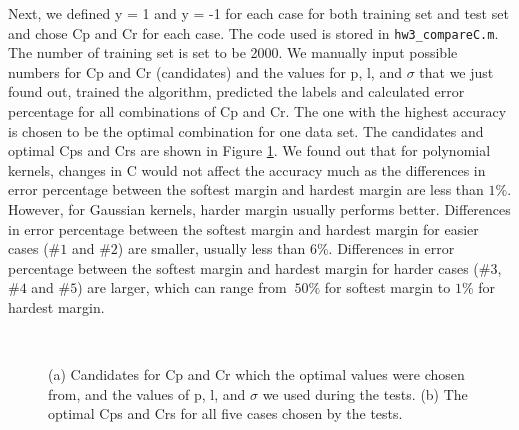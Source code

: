 \documentclass[UTF8,12pt]{article}
\begin{document}
	Next, we defined y = 1 and y = -1 for each case for both training set and test set and chose Cp and Cr for each case. The code used is stored in \texttt{hw3\_compareC.m}. The number of training set is set to be 2000. We manually input possible numbers for Cp and Cr (candidates) and the values for p, l, and $\sigma$ that we just found out, trained the algorithm, predicted the labels and calculated error percentage for all combinations of Cp and Cr. The one with the highest accuracy is chosen to be the optimal combination for one data set. The candidates and optimal Cps and Crs are shown in Figure \ref{fig:C}. We found out that for polynomial kernels, changes in C would not affect the accuracy much as the differences in error percentage between the softest margin and hardest margin are less than $1\%$. However, for Gaussian kernels, harder margin usually performs better. Differences in error percentage between the softest margin and hardest margin for easier cases ($\#1$ and $\#2$) are smaller, usually less than $6\%$. Differences in error percentage between the softest margin and hardest margin for harder cases ($\#3$, $\#4$ and $\#5$) are larger, which can range from $~50\%$ for softest margin to $1\%$ for hardest margin.
	\begin{figure}[!ht]
		\centering
		\\
		\caption{\label{fig:C}(a) Candidates for Cp and Cr which the optimal values were chosen from, and the values of p, l, and $\sigma$ we used during the tests. (b) The optimal Cps and Crs for all five cases chosen by the tests.}
	\end{figure}
	
\end{document}
